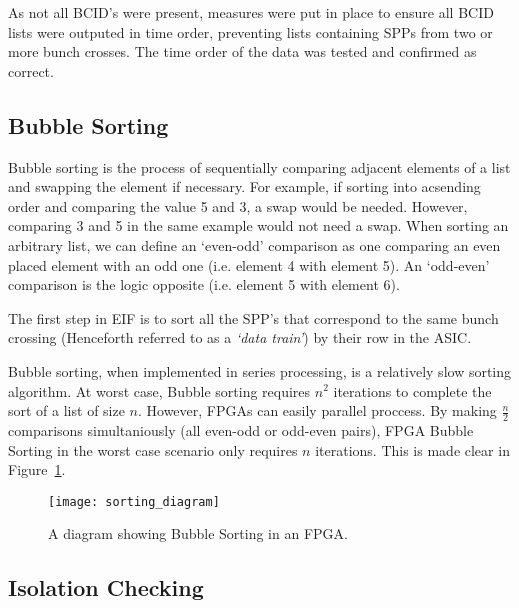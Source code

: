 		As not all BCID's were present, measures were put in place to ensure all BCID lists were outputed in time order, preventing lists containing SPPs from two or more bunch crosses. The time order of the data was tested and confirmed as correct.

		\subsection{Bubble Sorting}

		Bubble sorting is the process of sequentially comparing adjacent elements of a list and swapping the element if necessary.
		For example, if sorting into acsending order and comparing the value 5 and 3, a swap would be needed.
		However, comparing 3 and 5 in the same example would not need a swap.
		When sorting an arbitrary list, we can define an `even-odd' comparison as one comparing an even placed element with an odd one (i.e. element 4 with element 5).
		An `odd-even' comparison is the logic opposite (i.e. element 5 with element 6).
		\par
		The first step in EIF is to sort all the SPP's that correspond to the same bunch crossing (Henceforth referred to as a \textit{`data train'}) by their row in the ASIC.
		\par
		Bubble sorting, when implemented in series processing, is a relatively slow sorting algorithm.
		At worst case, Bubble sorting requires $n^2$ iterations to complete the sort of a list of size $n$.
		However, FPGAs can easily parallel proccess.
		By making $\frac{n}{2}$ comparisons simultaniously (all even-odd or odd-even pairs), FPGA Bubble Sorting in the worst case scenario only requires $n$ iterations. This is made clear in Figure~\ref{fig:sorting}.

		\begin{figure}[ht]
			\centering
			\texttt{[image: sorting\_diagram]}
			\caption{A diagram showing Bubble Sorting in an FPGA.}
			\label{fig:sorting}
		\end{figure}

	\subsection{Isolation Checking}

